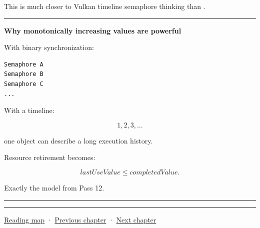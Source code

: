 This is much closer to Vulkan timeline semaphore thinking than .

\begin{center}\rule{0.5\linewidth}{0.5pt}\end{center}

\textbf{Why monotonically increasing values are powerful}

With binary synchronization:

\begin{verbatim}
Semaphore A
Semaphore B
Semaphore C
...
\end{verbatim}

With a timeline:

\[
1,2,3,\dots
\]

one object can describe a long execution history.

Resource retirement becomes:

\[
lastUseValue
\le
completedValue.
\]

Exactly the model from Pass 12.

\begin{center}\rule{0.5\linewidth}{0.5pt}\end{center}

\begin{center}\rule{0.5\linewidth}{0.5pt}\end{center}

\hyperref[volume-reading-map]{Reading map} · \hyperref[01-foundations-i-ch014-submit-synchronize-and-retire-gpu-work]{Previous chapter} · \hyperref[01-foundations-i-ch016-profile-gpus-and-respect-apple-ownership-boundaries]{Next chapter}
